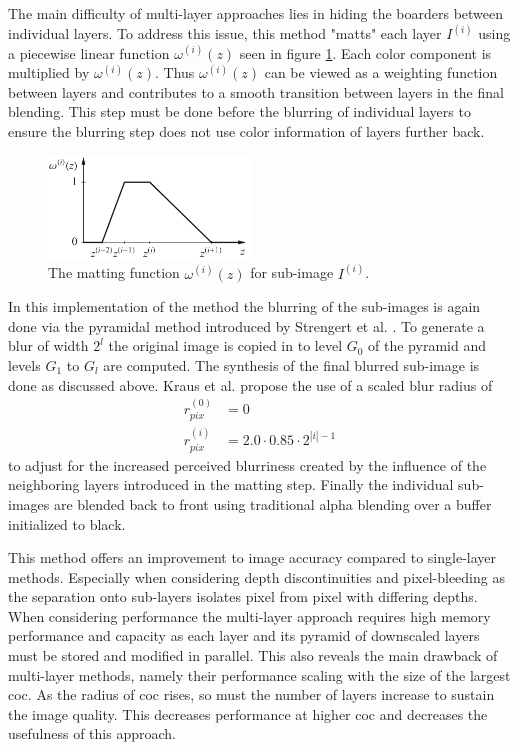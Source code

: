 The main difficulty of multi-layer approaches lies in hiding the boarders between individual layers.
To address this issue, this method "matts" each layer $I^{(i)}$ using a piecewise linear function $\omega^{(i)}(z)$ seen in figure \ref{fig:matt-func}.
Each color component is multiplied by $\omega^{(i)}(z)$.
Thus $\omega^{(i)}(z)$ can be viewed as a weighting function between layers and contributes to a smooth transition between layers in the final blending.
This step must be done before the blurring of individual layers to ensure the blurring step does not use color information of layers further back.\cite{Kraus.2007}

\begin{figure}
\begin{center}
    \includegraphics[width=0.48\textwidth]{images/matt-function.png}
\end{center}
\caption{The matting function $\omega^{(i)}(z)$ for sub-image $I^{(i)}$.\cite{Kraus.2007}}
\label{fig:matt-func}
\end{figure}

In this implementation of the method the blurring of the sub-images is again done via the pyramidal method introduced by Strengert et al. \cite{Strengert.2006}.
To generate a blur of width $2^l$ the original image is copied in to level $G_0$ of the pyramid and levels $G_1$ to $G_l$ are computed.
The synthesis of the final blurred sub-image is done as discussed above.
Kraus et al. propose the use of a scaled blur radius of
\begin{align}
    r^{(0)}_{pix} &= 0 \\
    r^{(i)}_{pix} &= 2.0 \cdot 0.85 \cdot 2^{|i| - 1}
\end{align}
to adjust for the increased perceived blurriness created by the influence of the neighboring layers introduced in the matting step.
Finally the individual sub-images are blended back to front using traditional alpha blending over a buffer initialized to black.\cite{Kraus.2007}

This method offers an improvement to image accuracy compared to single-layer methods.
Especially when considering depth discontinuities and pixel-bleeding as the separation onto sub-layers isolates pixel from pixel with differing depths.
When considering performance the multi-layer approach requires high memory performance and capacity as each layer and its pyramid of downscaled layers must be stored and modified in parallel.
This also reveals the main drawback of multi-layer methods, namely their performance scaling with the size of the largest \gls{coc}.
As the radius of \gls{coc} rises, so must the number of layers increase to sustain the image quality.
This decreases performance at higher \gls{coc} and decreases the usefulness of this approach.